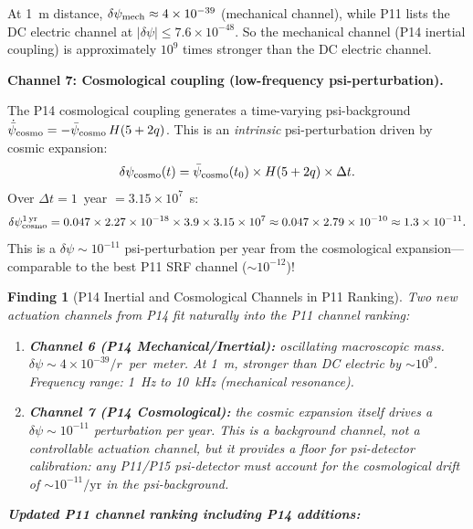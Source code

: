 \documentclass[11pt]{article}
\newtheorem{finding}{Finding}
\newcommand{\ee}[1]{\times 10^{#1}}
\newcommand{\psibar}{\bar{\psi}}
\begin{document}
At 1~m distance, $\delta\psi_{\rm mech} \approx 4\ee{-39}$ (mechanical channel),
while P11 lists the DC electric channel at $|\delta\psi| \leq 7.6\ee{-48}$.
So the mechanical channel (P14 inertial coupling) is approximately $10^9$ times
stronger than the DC electric channel.

\textbf{Channel 7: Cosmological coupling (low-frequency psi-perturbation).}

The P14 cosmological coupling generates a time-varying psi-background
$\dot{\psibar}_{\rm cosmo} = -\psibar_{\rm cosmo}\,H(5+2q)$. This is
an \emph{intrinsic} psi-perturbation driven by cosmic expansion:
\begin{equation}
\delta\psi_{\rm cosmo}(t) = \psibar_{\rm cosmo}(t_0)\times H(5+2q)\times \Delta t.
\label{eq:psi-cosmo-dt}
\end{equation}
Over $\Delta t = 1$~year $= 3.15\ee{7}$~s:
\begin{equation}
\delta\psi_{\rm cosmo}^{\rm 1\,yr}
= 0.047 \times 2.27\ee{-18} \times 3.9 \times 3.15\ee{7}
\approx 0.047 \times 2.79\ee{-10}
\approx 1.3\ee{-11}.
\label{eq:psi-cosmo-1yr}
\end{equation}
This is a $\delta\psi \sim 10^{-11}$ psi-perturbation per year from the
cosmological expansion---comparable to the best P11 SRF channel ($\sim 10^{-12}$)!

\begin{finding}[P14 Inertial and Cosmological Channels in P11 Ranking]
Two new actuation channels from P14 fit naturally into the P11 channel ranking:

\begin{enumerate}
\item \textbf{Channel 6 (P14 Mechanical/Inertial):} oscillating macroscopic mass.
  $\delta\psi \sim 4\ee{-39}/r$~per~meter. At 1~m, stronger than DC electric
  by $\sim 10^9$. Frequency range: 1~Hz to 10~kHz (mechanical resonance).

\item \textbf{Channel 7 (P14 Cosmological):} the cosmic expansion itself drives
  a $\delta\psi \sim 10^{-11}$ perturbation per year. This is a \emph{background}
  channel, not a controllable actuation channel, but it provides a floor for
  psi-detector calibration: any P11/P15 psi-detector must account for the
  cosmological drift of $\sim 10^{-11}/\text{yr}$ in the psi-background.
\end{enumerate}

\textbf{Updated P11 channel ranking including P14 additions:}
\end{finding}
\end{document}
